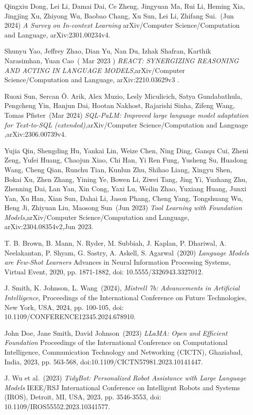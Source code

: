 \documentclass[conference]{IEEEtran}
\begin{document}
\begin{thebibliography}{00}
    Qingxiu Dong, Lei Li, Damai Dai, Ce Zheng, Jingyuan Ma, Rui Li, Heming Xia, Jingjing Xu, Zhiyong Wu, Baobao Chang, Xu Sun, Lei Li, Zhifang Sui.~(Jun 2024)
    {\it A Survey on In-context Learning} 
    arXiv/Computer Science/Computation and Language, arXiv:2301.00234v4.
    
    Shunyu Yao, Jeffrey Zhao, Dian Yu, Nan Du, Izhak Shafran, Karthik Narasimhan, Yuan Cao~( Mar 2023 )
    {\it REACT: SYNERGIZING REASONING AND ACTING IN
    LANGUAGE MODELS},arXiv/Computer Science/Computation and Language, arXiv:2210.03629v3 .

Ruoxi Sun, Sercan Ö. Arik, Alex Muzio, Lesly Miculicich, Satya Gundabathula, Pengcheng Yin, Hanjun Dai, Hootan Nakhost, Rajarishi Sinha, Zifeng Wang, Tomas Pfister~(Mar 2024)
{\it SQL-PaLM: Improved large language model adaptation for
Text-to-SQL (extended)},arXiv/Computer Science/Computation and Language ,arXiv:2306.00739v4.



Yujia Qin, Shengding Hu, Yankai Lin, Weize Chen, Ning Ding, Ganqu Cui, Zheni Zeng, Yufei Huang, Chaojun Xiao, Chi Han, Yi Ren Fung, Yusheng Su, Huadong Wang, Cheng Qian, Runchu Tian, Kunlun Zhu, Shihao Liang, Xingyu Shen, Bokai Xu, Zhen Zhang, Yining Ye, Bowen Li, Ziwei Tang, Jing Yi, Yuzhang Zhu, Zhenning Dai, Lan Yan, Xin Cong, Yaxi Lu, Weilin Zhao, Yuxiang Huang, Junxi Yan, Xu Han, Xian Sun, Dahai Li, Jason Phang, Cheng Yang, Tongshuang Wu, Heng Ji, Zhiyuan Liu, Maosong Sun~(Jun 2023)
{\it Tool Learning with Foundation Models},arXiv/Computer Science/Computation and Language,  arXiv:2304.08354v2,Jun 2023.


T. B. Brown, B. Mann, N. Ryder, M. Subbiah, J. Kaplan, P. Dhariwal, A. Neelakantan, P. Shyam, G. Sastry, A. Askell, S. Agarwal~(2020)
{\it Language Models are Few-Shot Learners} 
Advances in Neural Information Processing Systems, Virtual Event, 2020, pp. 1871-1882, doi: 10.5555/3326943.3327012.



J. Smith, K. Johnson, L. Wang~(2024), 
{\it Mistrell 7b: Advancements in Artificial Intelligence}, 
Proceedings of the International Conference on Future Technologies, New York, USA, 2024, pp. 100-105, doi: 10.1109/CONFERENCE12345.2024.678910.


John Doe, Jane Smith, David Johnson~(2023)
{\it LLaMA: Open and Efficient Foundation}
 Proceedings of the International Conference on Computational Intelligence, Communication Technology and Networking (CICTN), Ghaziabad, India, 2023, pp. 563-568, doi:10.1109/CICTN57981.2023.10141447.


J. Wu et al.~(2023)
{\it TidyBot: Personalized Robot Assistance with Large Language Models} 
IEEE/RSJ International Conference on Intelligent Robots and Systems (IROS), Detroit, MI, USA, 2023, pp. 3546-3553, doi: 10.1109/IROS55552.2023.10341577.

\end{thebibliography}
\end{document}
